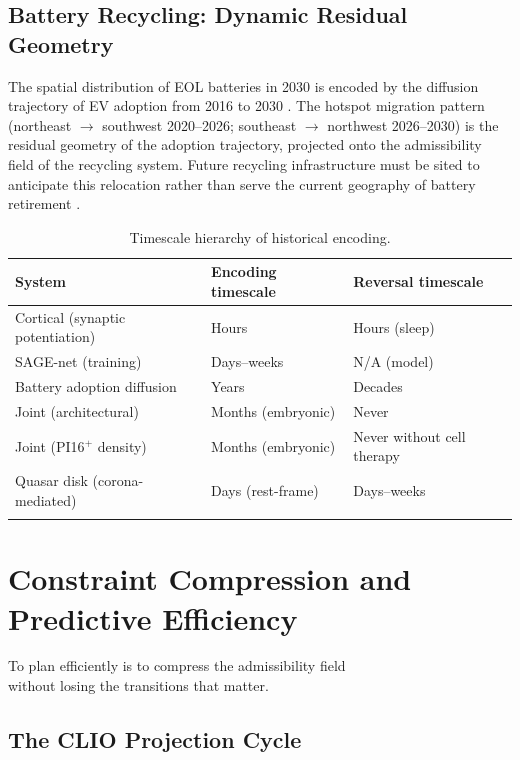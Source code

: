\documentclass[12pt, a4paper, twoside]{book}
\theoremstyle{definition}
\theoremstyle{remark}
\begin{document}
\section{Battery Recycling: Dynamic Residual Geometry}

The spatial distribution of EOL batteries in 2030 is encoded by the diffusion trajectory of EV adoption from 2016 to 2030 \citep{tian2026}. The hotspot migration pattern (northeast $\to$ southwest 2020--2026; southeast $\to$ northwest 2026--2030) is the residual geometry of the adoption trajectory, projected onto the admissibility field of the recycling system. Future recycling infrastructure must be sited to anticipate this relocation rather than serve the current geography of battery retirement \citep{tian2026, cheng2024}.

\begin{longtable}{p{4.5cm}p{3cm}p{3cm}}
\toprule
\textbf{System} & \textbf{Encoding timescale} & \textbf{Reversal timescale} \\
\midrule
Cortical (synaptic potentiation) & Hours & Hours (sleep) \\
SAGE-net (training) & Days--weeks & N/A (model) \\
Battery adoption diffusion & Years & Decades \\
Joint (architectural) & Months (embryonic) & Never \\
Joint (PI16$^+$ density) & Months (embryonic) & Never without cell therapy \\
Quasar disk (corona-mediated) & Days (rest-frame) & Days--weeks \\
\bottomrule
\caption{Timescale hierarchy of historical encoding.}
\end{longtable}

\chapter{Constraint Compression and Predictive Efficiency}
\label{ch:compression}

\epigraph{To plan efficiently is to compress the admissibility field\\
  without losing the transitions that matter.}{}

\section{The CLIO Projection Cycle}
\end{document}
